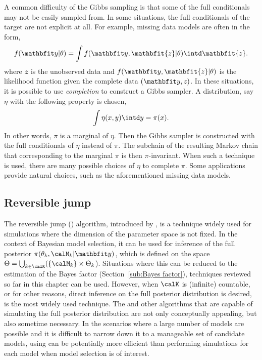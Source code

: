 A common difficulty of the Gibbs sampling is that some of the full
conditionals may not be easily sampled from. In some situations, the full
conditionals of the target are not explicit at all. For example, missing data
models are often in the form,
\begin{equation*}
  f(\data|\theta) = \int f(\data, \mathbfit{z}|\theta)\intd \mathbfit{z}.
\end{equation*}
where $\mathbfit{z}$ is the unobserved data and $f(\data,\mathbfit{z}|\theta)$
is the likelihood function given the complete data $(\data,\mathit{z})$. In
these situations, it is possible to use \emph{completion} to construct a Gibbs
sampler. A distribution, say $\eta$ with the following property is chosen,
\begin{equation}
  \int\eta(x,y)\intd y = \pi(x).
\end{equation}
In other words, $\pi$ is a marginal of $\eta$. Then the Gibbs sampler is
constructed with the full conditionals of $\eta$ instead of $\pi$. The
subchain of the resulting Markov chain that corresponding to the marginal
$\pi$ is then $\pi$-invariant. When such a technique is used, there are many
possible choices of $\eta$ to complete $\pi$. Some applications provide
natural choices, such as the aforementioned missing data models.

\subsection{Reversible jump \protect\mcmc}
\label{sub:Reversible jump mcmc}

The reversible jump \mcmc (\rjmcmc) algorithm, introduced by
\cite{Green:1995dg}, is a technique widely used for simulations where the
dimension of the parameter space is not fixed. In the context of Bayesian
model selection, it can be used for inference of the full posterior
$\pi(\theta_k,\calM_k|\data)$, which is defined on the space $\Theta =
\bigcup_{k\in\calK}(\{\calM_k\}\times\Theta_k$). Situations where this can be
reduced to the estimation of the Bayes factor (Section~\ref{sub:Bayes
factor}), techniques reviewed so far in this chapter can be used. However,
when $\calK$ is (infinite) countable, or for other reasons, direct inference
on the full posterior distribution is desired, \rjmcmc is the most widely
used technique. The \rjmcmc and other algorithms that are capable of
simulating the full posterior distribution are not only conceptually
appealing, but also sometime necessary. In the scenarios where a large number
of models are possible and it is difficult to narrow down it to a manageable
set of candidate models, using \rjmcmc can be potentially more efficient than
performing simulations for each model when model selection is of interest.

